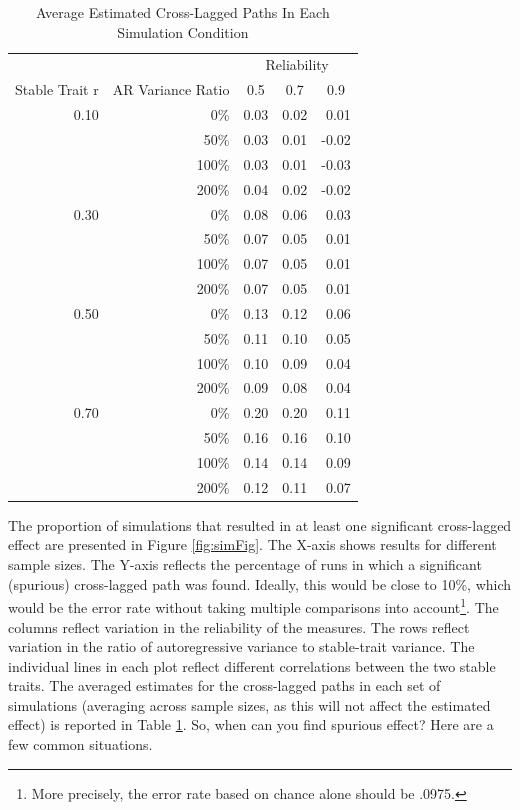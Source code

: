 \documentclass[
  english,
  man,floatsintext]{apa6}
\begin{document}
\begin{table}[tbp]

\begin{center}
\begin{threeparttable}

\caption{\label{tab:simTab}Average Estimated Cross-Lagged Paths In Each Simulation Condition}

\begin{tabular}{rrrrr}
\toprule
 &  & \multicolumn{3}{c}{Reliability} \\
\cmidrule(r){3-5}
Stable Trait r & \multicolumn{1}{c}{AR Variance Ratio} & \multicolumn{1}{c}{0.5} & \multicolumn{1}{c}{0.7} & \multicolumn{1}{c}{0.9}\\
\midrule
0.10 & 0\% & 0.03 & 0.02 & 0.01\\
 & 50\% & 0.03 & 0.01 & -0.02\\
 & 100\% & 0.03 & 0.01 & -0.03\\
 & 200\% & 0.04 & 0.02 & -0.02\\ \midrule
0.30 & 0\% & 0.08 & 0.06 & 0.03\\
 & 50\% & 0.07 & 0.05 & 0.01\\
 & 100\% & 0.07 & 0.05 & 0.01\\
 & 200\% & 0.07 & 0.05 & 0.01\\ \midrule
0.50 & 0\% & 0.13 & 0.12 & 0.06\\
 & 50\% & 0.11 & 0.10 & 0.05\\
 & 100\% & 0.10 & 0.09 & 0.04\\
 & 200\% & 0.09 & 0.08 & 0.04\\ \midrule
0.70 & 0\% & 0.20 & 0.20 & 0.11\\
 & 50\% & 0.16 & 0.16 & 0.10\\
 & 100\% & 0.14 & 0.14 & 0.09\\
 & 200\% & 0.12 & 0.11 & 0.07\\
\bottomrule
\end{tabular}

\end{threeparttable}
\end{center}

\end{table}

The proportion of simulations that resulted in at least one significant cross-lagged effect are presented in Figure \ref{fig:simFig}. The X-axis shows results for different sample sizes. The Y-axis reflects the percentage of runs in which a significant (spurious) cross-lagged path was found. Ideally, this would be close to 10\%, which would be the error rate without taking multiple comparisons into account\footnote{More precisely, the error rate based on chance alone should be .0975.}. The columns reflect variation in the reliability of the measures. The rows reflect variation in the ratio of autoregressive variance to stable-trait variance. The individual lines in each plot reflect different correlations between the two stable traits. The averaged estimates for the cross-lagged paths in each set of simulations (averaging across sample sizes, as this will not affect the estimated effect) is reported in Table \ref{tab:simTab}. So, when can you find spurious effect? Here are a few common situations.
\end{document}
